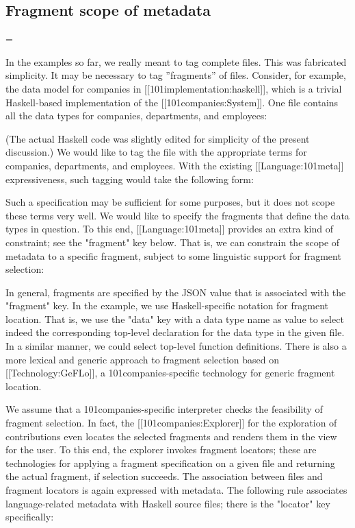 
\subsection{Fragment scope of metadata}
=

In the examples so far, we really meant to tag complete files. This was fabricated simplicity. It may be necessary to tag ''fragments'' of files. Consider, for example, the data model for companies in [[101implementation:haskell]], which is a trivial Haskell-based implementation of the [[101companies:System]]. One file contains all the data types for companies, departments, and employees:




(The actual Haskell code was slightly edited for simplicity of the present discussion.) We would like to tag the file with the appropriate terms for companies, departments, and employees. With the existing [[Language:101meta]] expressiveness, such tagging would take the following form:



Such a specification may be sufficient for some purposes, but it does not scope these terms very well. We would like to specify the fragments that define the data types in question.  To this end, [[Language:101meta]] provides an extra kind of constraint; see the "fragment" key below. That is, we can constrain the scope of metadata to a specific fragment, subject to some linguistic support for fragment selection:



In general, fragments are specified by the JSON value that is associated with the "fragment" key. In the example, we use Haskell-specific notation for fragment location. That is, we use the "data" key with a data type name as value to select indeed the corresponding top-level declaration for the data type in the given file. In a similar manner, we could select top-level function definitions. There is also a more lexical and generic approach to fragment selection based on [[Technology:GeFLo]], a 101companies-specific technology for generic fragment location.

We assume that a 101companies-specific interpreter checks the feasibility of fragment selection. In fact, the [[101companies:Explorer]] for the exploration of contributions even locates the selected fragments and renders them in the view for the user. To this end, the explorer invokes fragment locators; these are technologies for applying a fragment specification on a given file and returning the actual fragment, if selection succeeds. The association between files and fragment locators is again expressed with metadata. The following rule associates language-related metadata with Haskell source files; there is the "locator" key specifically:


